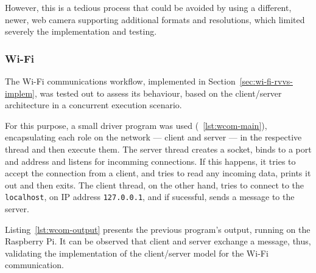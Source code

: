 However, this is a tedious process that could be avoided by using a different,
newer, web camera supporting additional formats and resolutions, which limited
severely the implementation and testing.
%
\subsubsection{Wi-Fi}%
\label{sec:wifi-rvvs-test}
The Wi-Fi communications workflow, implemented in
Section~\ref{sec:wi-fi-rvvs-implem}, was tested out to assess its behaviour,
based on the client/server architecture in a concurrent execution scenario.

For this purpose, a small driver program was used (~\ref{lst:wcom-main}), encapsulating each role on
the network --- client and server --- in the respective thread and then execute
them. The server thread creates a socket, binds to a port and address and
listens for incomming connections. If this happens, it tries to accept the
connection from a client, and tries to read any incoming data, prints it out and
then exits. The client thread, on the other hand, tries to connect to the
\texttt{localhost}, on IP address \texttt{127.0.0.1}, and if sucessful, sends
a message to the server.
%

Listing~\ref{lst:wcom-output} presents the previous program's output, running on
the Raspberry Pi. It can be observed that client and server exchange a message,
thus, validating the implementation of the client/server model for the Wi-Fi communication. 
%
%
%
